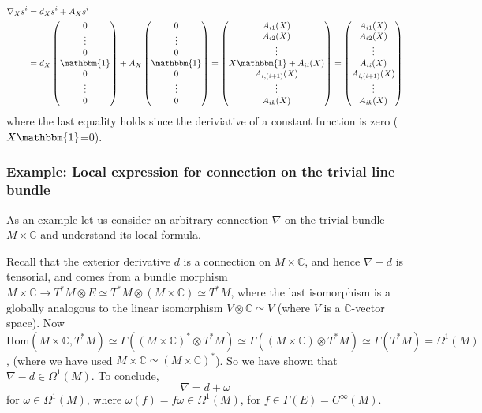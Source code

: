 \documentclass[a4paper]{article}
\theoremstyle{definition} \newtheorem*{definition}{Definition}
\theoremstyle{definition} \newtheorem*{definitions}{Definitions}
\theoremstyle{plain} \newtheorem{theorem}{Theorem}[section]
\theoremstyle{plain} \newtheorem{proposition}[theorem]{Proposition}
\theoremstyle{plain} \newtheorem{corollary}[theorem]{Corollary}
\theoremstyle{plain} \newtheorem{lemma}[theorem]{Lemma}
\theoremstyle{plain} \newtheorem{example}[theorem]{Example}
\newcommand{\complexnos}{\mathbb{C}}
\newcommand{\Hom}{\text{Hom}}
\newcommand{\smooth}{C^\infty}
\begin{document}
\begin{align*}
    \nabla_X s^i & = d_X s^i + A_X s^i \\
    & = d_X \begin{pmatrix}0 \\ \vdots \\ 0 \\ \mathbbm{1} \\ 0 \\ \vdots \\ 0\end{pmatrix} +
     A_X \begin{pmatrix}0 \\ \vdots \\ 0 \\ \mathbbm{1} \\ 0 \\ \vdots \\ 0\end{pmatrix} 
     = \begin{pmatrix}A_{i1}(X) \\ A_{i2}(X) \\ \vdots \\ X\mathbbm{1} + A_{ii}(X)\\ A_{i, (i+1)}(X) \\ \vdots \\ A_{ik}(X)\end{pmatrix} 
     = \begin{pmatrix}A_{i1}(X) \\ A_{i2}(X) \\ \vdots \\ A_{ii}(X)\\ A_{i, (i+1)}(X) \\ \vdots \\ A_{ik}(X)\end{pmatrix} 
\end{align*}
where the last equality holds since the deriviative of a constant function is zero ($X\mathbbm{1}$=0).

\subsubsection{Example: Local expression for connection on the trivial line bundle}
As an example let us consider an arbitrary connection $\nabla$ on the trivial bundle $M\times \complexnos$ and understand its local formula. 

Recall that the exterior derivative $d$ is a connection on $M\times \complexnos$, and hence $\nabla - d$ is tensorial, and comes from a bundle morphism $M\times \complexnos\to T^*M\otimes E \simeq T^*M\otimes (M\times \complexnos)\simeq T^* M$, where the last isomorphism is a globally analogous to the linear isomorphism $V\otimes \complexnos\simeq V$ (where $V$ is a $\complexnos$-vector space). 
Now $\Hom(M\times \complexnos, T^*M)\simeq \Gamma((M\times \complexnos)^*\otimes T^*M)\simeq \Gamma((M\times \complexnos)\otimes T^*M) \simeq \Gamma(T^*M) = \Omega^1(M)$, (where we have used $M\times \complexnos \simeq (M\times \complexnos)^*$). So we have shown that $\nabla - d\in \Omega^1(M)$. To conclude,
$$\nabla = d + \omega$$
for $\omega \in \Omega^1(M)$, where $\omega(f)=f\omega \in \Omega^1(M)$, for $f\in \Gamma(E)=\smooth(M)$.
\end{document}
